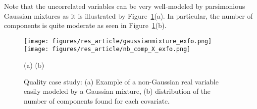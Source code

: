 \documentclass[12pt,a4paper]{report}
\begin{document}
\vspace{3mm}

Note that the uncorrelated variables can be very well-modeled by parsimonious Gaussian mixtures as it is illustrated by Figure~\ref{fig:graphMixmod.quality}(a). In particular, the number of components is quite moderate as seen in Figure~\ref{fig:graphMixmod.quality}(b).
		
		\begin{figure}[h!]
\begin{center}
			\texttt{[image: figures/res\_article/gaussianmixture\_exfo.png]}
			\texttt{[image: figures/res\_article/nb\_comp\_X\_exfo.png]}
\end{center}
\vspace{-5mm}
			\centerline{(a) \hspace{180px} (b)}
			\caption{Quality case study: (a) Example of a non-Gaussian real variable easily modeled by a Gaussian mixture, (b) distribution of the number of components found for each covariate.}\label{fig:graphMixmod.quality}
\end{figure}  	


%
%	
%
%		
%		
		
\end{document}
